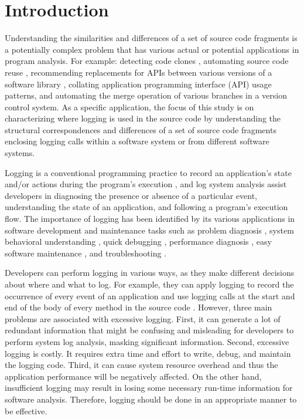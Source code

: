 
\chapter{Introduction}  \label{Introduction}

Understanding the similarities and differences of a set of source code fragments is a potentially complex problem that has various actual or potential applications in program analysis. For example: detecting code clones \cite{bulychev2009evaluation}, automating source code reuse \cite{2008:fse:cottrell}, recommending replacements for APIs between various versions of a software library \cite{2014:uofc:cossette}, collating application programming interface (API) usage patterns, and automating the merge operation of various branches in a version control system. As a specific application, the focus of this study is on characterizing where logging is used in the source code by understanding the structural correspondences and differences of a set of source code fragments enclosing logging calls within a software system or from different software systems.

Logging is a conventional programming practice to record an application's state and/or actions during the program's execution \cite{gupta2005pro}, and log system analysis assist developers in diagnosing the presence or absence of a particular event,  understanding the state of an application, and following a program's execution flow. The importance of logging has been identified by its various applications in software development and maintenance tasks such as problem diagnosis \cite{lou2010mining}, system behavioral understanding \cite{fu2013contextual}, quick debugging \cite{gupta2005pro}, performance diagnosis \cite{nagaraj2012structured}, easy software maintenance \cite{gupta2005pro}, and troubleshooting \cite{fu2009execution}.

Developers can perform logging in various ways, as they make different decisions about where and what to log. For example, they can apply logging to record the occurrence of every event of an application and use logging calls at the start and end of the body of every method in the source code \cite{clarke1999dimension,clarke1999subject}. However, three main problems are associated with excessive logging. First, it can generate a lot of redundant information that might be confusing and misleading for developers to perform system log analysis, masking significant information. Second, excessive logging is costly. It requires extra time and effort to write, debug, and maintain the logging code. Third, it can cause system resource overhead and thus the application performance will be negatively affected. On the other hand, insufficient logging may result in losing some necessary run-time information for software analysis.
Therefore, logging should be done in an appropriate manner to be effective.


